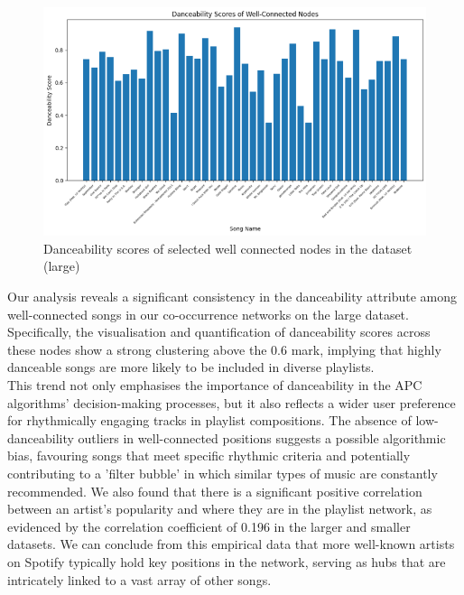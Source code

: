 \documentclass[conference]{IEEEtran}
\begin{document}
\begin{figure}[h!]
    \centering
    \includegraphics[width=1\linewidth]{images/songvsdanceability.png}
    \caption{Danceability scores of selected well connected nodes in the dataset (large)}
    \label{fig:enter-label}
\end{figure}

Our analysis reveals a significant consistency in the danceability attribute among well-connected songs in our co-occurrence networks on the large dataset. Specifically, the visualisation and quantification of danceability scores across these nodes show a strong clustering above the 0.6 mark, implying that highly danceable songs are more likely to be included in diverse playlists. \\

This trend not only emphasises the importance of danceability in the APC algorithms' decision-making processes, but it also reflects a wider user preference for rhythmically engaging tracks in playlist compositions. The absence of low-danceability outliers in well-connected positions suggests a possible algorithmic bias, favouring songs that meet specific rhythmic criteria and potentially contributing to a 'filter bubble' in which similar types of music are constantly recommended. We also found that there is a significant positive correlation between an artist's popularity and where they are in the playlist network, as evidenced by the correlation coefficient of 0.196 in the larger and smaller datasets. We can conclude from this empirical data that more well-known artists on Spotify typically hold key positions in the network, serving as hubs that are intricately linked to a vast array of other songs. \\
\end{document}

